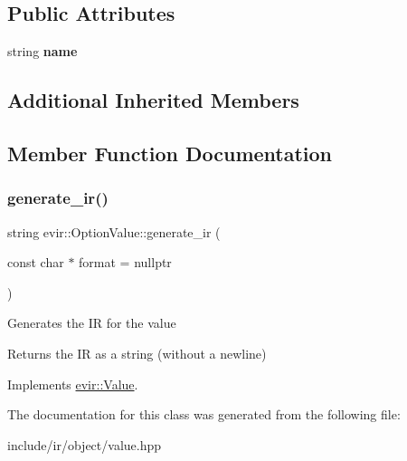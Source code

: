 \subsection*{Public Attributes}
\begin{DoxyCompactItemize}
\item 
\mbox{\label{classevir_1_1OptionValue_a63f37acb5bd04ab6c2dd9ddb78e70318}} 
string {\bfseries name}
\end{DoxyCompactItemize}
\subsection*{Additional Inherited Members}


\subsection{Member Function Documentation}
\mbox{\label{classevir_1_1OptionValue_a8bd21c46fc29805637eed4473f1fa371}} 
\subsubsection{\texorpdfstring{generate\+\_\+ir()}{generate\_ir()}}
{\footnotesize\ttfamily string evir\+::\+Option\+Value\+::generate\+\_\+ir (\begin{DoxyParamCaption}\item[{const char $\ast$}]{format = {\ttfamily nullptr} }\end{DoxyParamCaption})\hspace{0.3cm}{\ttfamily [virtual]}}

Generates the IR for the value \begin{DoxyReturn}{Returns}
the IR as a string (without a newline) 
\end{DoxyReturn}


Implements \hyperlink{classevir_1_1Value_a3e7e5bc634fd5bba528324076fe2a763}{evir\+::\+Value}.



The documentation for this class was generated from the following file\+:\begin{DoxyCompactItemize}
\item 
include/ir/object/value.\+hpp\end{DoxyCompactItemize}
